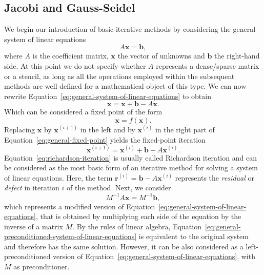 \subsection{Jacobi and Gauss-Seidel} 
We begin our introduction of basic iterative methods by considering the general system of linear equations
\begin{equation}
	A \bm{x} = \bm{b},
	\label{eq:general-system-of-linear-equations}
\end{equation}
where $A$ is the coefficient matrix, $\bm x$ the vector of unknowns and $\bm b$ the right-hand side.
At this point we do not specify whether $A$ represents a dense/sparse matrix or a stencil, as long as all the operations employed within the subsequent methods are well-defined for a mathematical object of this type.
We can now rewrite Equation~\eqref{eq:general-system-of-linear-equations} to obtain
\begin{equation}
	\bm{x} = \bm{x} + \bm b - A \bm{x}.
	\label{eq:general-fixed-point}
\end{equation}
Which can be considered a fixed point of the form
\begin{equation}
	\bm x = f(\bm x).
\end{equation} 
Replacing $\bm x$ by $\bm{x}^{(i+1)}$ in the left and by $\bm{x}^{(i)}$ in the right part of Equation~\eqref{eq:general-fixed-point} yields the fixed-point iteration
\begin{equation}
	\bm{x}^{(i+1)} = \bm{x}^{(i)} + \bm b - A \bm{x}^{(i)}.
	\label{eq:richardson-iteration}
\end{equation}
Equation~\eqref{eq:richardson-iteration} is usually called Richardson iteration and can be considered as the most basic form of an iterative method for solving a system of linear equations.
Here, the term $\bm{r}^{(i)} = \bm{b} - A \bm{x}^{(i)}$ represents the \emph{residual} or \emph{defect} in iteration $i$ of the method.
Next, we consider 
\begin{equation}
	M^{-1} A \bm{x} = M^{-1} \bm{b},
	\label{eq:general-preconditioned-system-of-linear-equations}
\end{equation}
which represents a modified version of Equation~\eqref{eq:general-system-of-linear-equations}, that is obtained by multiplying each side of the equation by the inverse of a matrix $M$.
By the rules of linear algebra, Equation~\eqref{eq:general-preconditioned-system-of-linear-equations} is equivalent to the original system and therefore has the same solution.
However, it can be also considered as a left-preconditioned version of Equation~\eqref{eq:general-system-of-linear-equations}, with $M$ as preconditioner.
